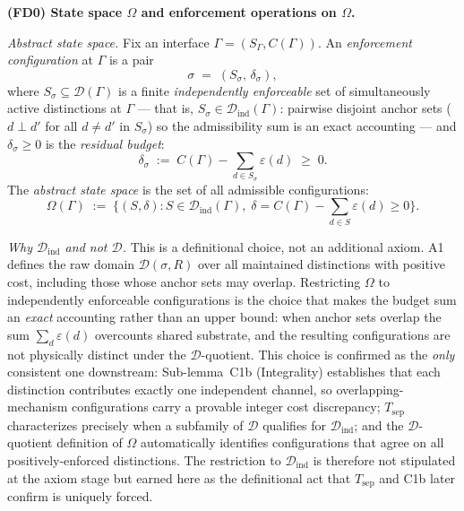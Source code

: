 \documentclass[11pt]{article}
\theoremstyle{remark}
\begin{document}
\begin{tcolorbox}[defbox, title={$\mathrm{FD4}$ (State Space and Enforcement Cost)}]
\noindent\textbf{(FD0) State space $\Omega$ and enforcement operations on $\Omega$.}

\smallskip\noindent\textit{Abstract state space.}
Fix an interface $\Gamma = (S_\Gamma, C(\Gamma))$.  An \emph{enforcement configuration} at $\Gamma$ is a pair
\[
\sigma \;=\; (S_\sigma,\, \delta_\sigma),
\]
where $S_\sigma \subseteq \mathcal{D}(\Gamma)$ is a finite \emph{independently enforceable} set of simultaneously active distinctions at $\Gamma$ --- that is, $S_\sigma \in \mathcal{D}_{\mathrm{ind}}(\Gamma)$: pairwise disjoint anchor sets ($d \perp d'$ for all $d \ne d'$ in $S_\sigma$) so the admissibility sum is an exact accounting --- and $\delta_\sigma \ge 0$ is the \emph{residual budget}:
\[
\delta_\sigma \;:=\; C(\Gamma) - \sum_{d \in S_\sigma} \varepsilon(d) \;\ge\; 0.
\]
The \emph{abstract state space} is the set of all admissible configurations:
\[
\Omega(\Gamma) \;:=\; \bigl\{ (S, \delta) : S \in \mathcal{D}_{\mathrm{ind}}(\Gamma),\; \delta = C(\Gamma) - \textstyle\sum_{d \in S}\varepsilon(d) \ge 0 \bigr\}.
\]

\smallskip\noindent\textit{Why $\mathcal{D}_{\mathrm{ind}}$ and not $\mathcal{D}$.}  This is a definitional choice, not an additional axiom.  A1 defines the raw domain $\mathcal{D}(\sigma,R)$ over all maintained distinctions with positive cost, including those whose anchor sets may overlap.  Restricting $\Omega$ to independently enforceable configurations is the choice that makes the budget sum an \emph{exact} accounting rather than an upper bound: when anchor sets overlap the sum $\sum_d \varepsilon(d)$ overcounts shared substrate, and the resulting configurations are not physically distinct under the $\mathcal{D}$-quotient.  This choice is confirmed as the \emph{only} consistent one downstream: Sub-lemma~C1b (Integrality) establishes that each distinction contributes exactly one independent channel, so overlapping-mechanism configurations carry a provable integer cost discrepancy; $T_{\mathrm{sep}}$ characterizes precisely when a subfamily of $\mathcal{D}$ qualifies for $\mathcal{D}_{\mathrm{ind}}$; and the $\mathcal{D}$-quotient definition of $\Omega$ automatically identifies configurations that agree on all positively-enforced distinctions.  The restriction to $\mathcal{D}_{\mathrm{ind}}$ is therefore not stipulated at the axiom stage but earned here as the definitional act that $T_{\mathrm{sep}}$ and C1b later confirm is uniquely forced.


\end{tcolorbox}
\end{document}
